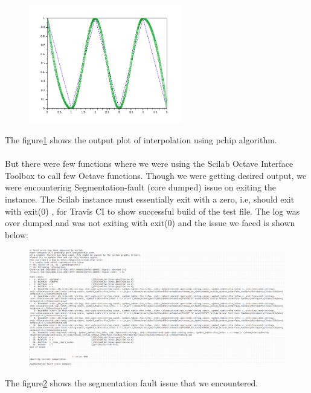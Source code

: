 \documentclass[12pt,a4paper]{report}
\begin{document}
\begin{figure}[H]
\centering
\includegraphics[width = 0.6\textwidth]{pchip.png}
\label{pchip}
\end{figure}
The figure\ref{pchip} shows the output plot of interpolation using pchip algorithm. \\\\

But there were few functions where we were using the Scilab Octave Interface Toolbox to call few Octave functions. Though we were getting desired output, we were encountering Segmentation-fault (core dumped) issue on exiting the instance. The Scilab instance must essentially exit with a zero, i.e, should exit with exit(0) , for Travis CI to show successful build of the test file. The log was over dumped and was not exiting with exit(0) and the issue we faced is shown below:\\


\begin{figure}[H]
\centering
\includegraphics[width = \linewidth]{segfault.png}
\label{segfault}
\end{figure}
The figure\ref{segfault} shows the segmentation fault issue that we encountered. \\
\end{document}
